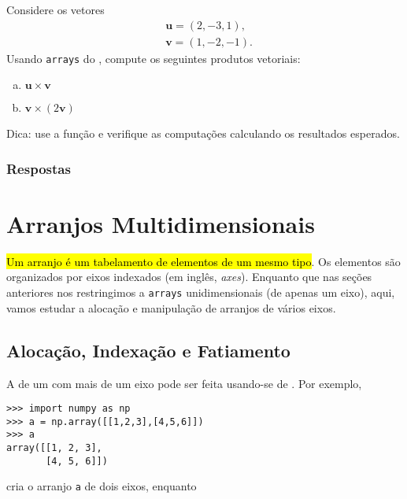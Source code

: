 \begin{exer}
  Considere os vetores
  \begin{align}
    &\pmb{u} = (2, -3, 1),\\
    &\pmb{v} = (1, -2, -1).
  \end{align}
  Usando \texttt{arrays} do {\numpy}, compute os seguintes produtos vetoriais:
  \begin{enumerate}[a)]
  \item $\pmb{u}\times\pmb{v}$
  \item $\pmb{v}\times (2\pmb{v})$
  \end{enumerate}
\end{exer}
\begin{resp}
  Dica: use a função {\PYTHONnumpyDOTcross} e verifique as computações calculando os resultados esperados.
\end{resp}

\ifisbook
\subsubsection{Respostas}
\shipoutAnswer
\fi

\section{Arranjos Multidimensionais}\label{cap_arr_sec_multi}

\hl{Um arranjo {\PYTHONnumpyDOTarray} é um tabelamento de elementos de um mesmo tipo}. Os elementos são organizados por eixos indexados (em inglês, \textit{axes}). Enquanto que nas seções anteriores nos restringimos a \texttt{arrays} unidimensionais (de apenas um eixo), aqui, vamos estudar a alocação e manipulação de arranjos de vários eixos.

\subsection{Alocação, Indexação e Fatiamento}

A  de um {\PYTHONnumpyDOTarray} com mais de um eixo pode ser feita usando-se de . Por exemplo,

\begin{lstlisting}
>>> import numpy as np
>>> a = np.array([[1,2,3],[4,5,6]])
>>> a
array([[1, 2, 3],
       [4, 5, 6]])
\end{lstlisting}

cria o arranjo \lstinline+a+ de dois eixos, enquanto

